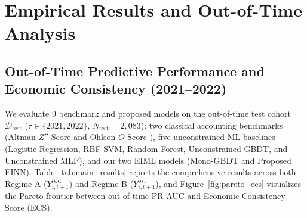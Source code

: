 \documentclass[pdflatex,sn-mathphys-num,twocolumn]{sn-jnl}
\theoremstyle{thmstyleone}
\theoremstyle{thmstyletwo}
\theoremstyle{thmstylethree}
\begin{document}
\section{Empirical Results and Out-of-Time Analysis}
\label{sec:experiments}

\subsection{Out-of-Time Predictive Performance and Economic Consistency (2021--2022)}
We evaluate 9 benchmark and proposed models on the out-of-time test cohort $\mathcal{D}_{\text{test}}$ ($\tau \in \{2021, 2022\}$, $N_{\text{test}}=2,083$): two classical accounting benchmarks (Altman $Z''$-Score \citep{altman1995emerging} and Ohlson $O$-Score \citep{ohlson1980financial}), five unconstrained ML baselines (Logistic Regression, RBF-SVM, Random Forest, Unconstrained GBDT, and Unconstrained MLP), and our two EIML models (Mono-GBDT and Proposed EINN). Table~\ref{tab:main_results} reports the comprehensive results across both Regime A ($Y_{i,t+1}^{\text{fwd}}$) and Regime B ($Y_{i,t+1}^{\text{ovl}}$), and Figure~\ref{fig:pareto_ecs} visualizes the Pareto frontier between out-of-time PR-AUC and Economic Consistency Score (ECS).
\end{document}
